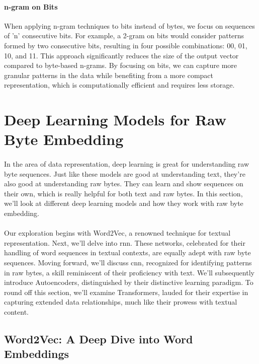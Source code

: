         \paragraph{n-gram on Bits}When applying n-gram techniques to bits instead of bytes, we focus on sequences of 'n' consecutive bits. For example, a 2-gram on bits would consider patterns formed by two consecutive bits, resulting in four possible combinations: 00, 01, 10, and 11. This approach significantly reduces the size of the output vector compared to byte-based n-grams. By focusing on bits, we can capture more granular patterns in the data while benefiting from a more compact representation, which is computationally efficient and requires less storage.

\section{Deep Learning Models for Raw Byte Embedding}\label{seq:background:deep_learning_models_for_raw_byte_embedding}

    \paragraph{}In the area of data representation, deep learning is great for understanding raw byte sequences. Just like these models are good at understanding text, they're also good at understanding raw bytes. They can learn and show sequences on their own, which is really helpful for both text and raw bytes. In this section, we'll look at different deep learning models and how they work with raw byte embedding.

    \paragraph{}Our exploration begins with Word2Vec, a renowned technique for textual representation. Next, we'll delve into \acrfull{rnn}. These networks, celebrated for their handling of word sequences in textual contexts, are equally adept with raw byte sequences. Moving forward, we'll discuss \acrfull{cnn}, recognized for identifying patterns in raw bytes, a skill reminiscent of their proficiency with text. We'll subsequently introduce Autoencoders, distinguished by their distinctive learning paradigm. To round off this section, we'll examine Transformers, lauded for their expertise in capturing extended data relationships, much like their prowess with textual content.

    \subsection{Word2Vec: A Deep Dive into Word Embeddings}

